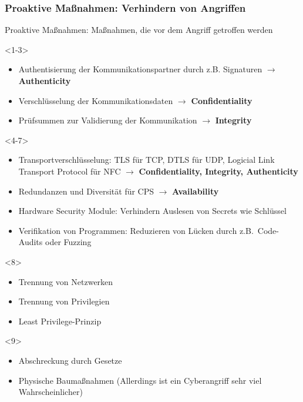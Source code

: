 \documentclass{sikslides}
\begin{document}
    \begin{frame}
        \frametitle{Proaktive Maßnahmen: Verhindern von Angriffen}
        \begin{block}{}
            Proaktive Maßnahmen: Maßnahmen, die vor dem Angriff getroffen werden
        \end{block}
        \vspace{20px}

        \begin{onlyenv}<1-3>
            \begin{itemize}[<+->]
                \item Authentisierung der Kommunikationspartner durch z.B. Signaturen $\rightarrow$ \textbf{Authenticity}
                \item Verschlüsselung der Kommunikationsdaten $\rightarrow$ \textbf{Confidentiality}
                \item Prüfsummen zur Validierung der Kommunikation $\rightarrow$ \textbf{Integrity}
            \end{itemize}
        \end{onlyenv}

        \begin{onlyenv}<4-7>
            \begin{itemize}[<+->]
                \item Transportverschlüsselung: TLS für TCP, DTLS für UDP, Logicial Link Transport Protocol für NFC $\rightarrow$ \textbf{Confidentiality, Integrity, Authenticity}
                \item Redundanzen und Diversität für CPS $\rightarrow$ \textbf{Availability}
                \item Hardware Security Module: Verhindern Auslesen von Secrets wie Schlüssel
                \item Verifikation von Programmen: Reduzieren von Lücken durch z.B.\ Code-Audits oder Fuzzing
            \end{itemize}
        \end{onlyenv}

        \begin{onlyenv}<8>
            \begin{itemize}
                \item Trennung von Netzwerken
                \item Trennung von Privilegien
                \item Least Privilege-Prinzip
                \pause
            \end{itemize}
        \end{onlyenv}

        \begin{onlyenv}<9>
            \begin{itemize}
                \item Abschreckung durch Gesetze
                \item Physische Baumaßnahmen (Allerdings ist ein Cyberangriff sehr viel Wahrscheinlicher)
            \end{itemize}
        \end{onlyenv}
    \end{frame}
\end{document}

